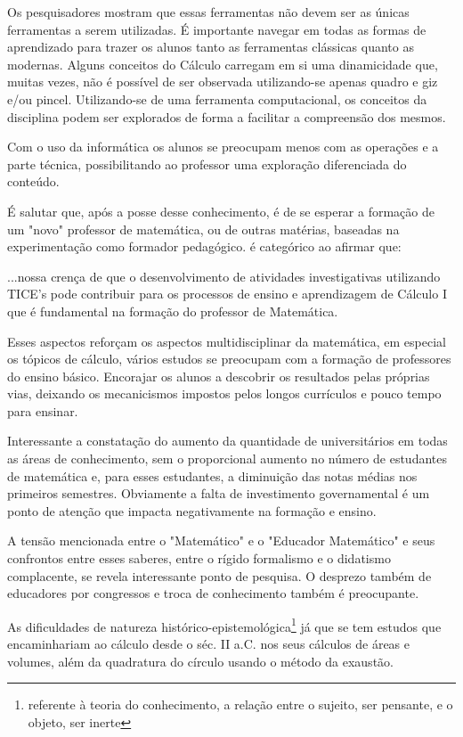 \documentclass[
	12pt,				%
	openright,			%
	oneside,
	a4paper,			%
	chapter=TITLE,		%
	section=TITLE,		%
	sumario=abnt-6027-2012,
	english,			%
	brazil				%
]{abntex2}
\begin{document}
	Os pesquisadores mostram que essas ferramentas não devem ser as únicas ferramentas a serem utilizadas. É importante navegar em todas as formas de aprendizado para trazer os alunos tanto as ferramentas clássicas quanto as modernas. Alguns conceitos do Cálculo carregam em si uma 	dinamicidade que, muitas vezes, não é possível de ser observada utilizando-se apenas quadro e giz e/ou pincel. Utilizando-se de uma ferramenta computacional, os conceitos da disciplina podem ser explorados de forma a facilitar a compreensão dos mesmos.
	
	Com o uso da informática os alunos se preocupam menos com as operações e a parte técnica, possibilitando ao professor uma exploração diferenciada do conteúdo. 
	
	É salutar que, após a posse desse conhecimento, é de se esperar a formação de um "novo" professor de matemática, ou de outras matérias, baseadas na experimentação como formador pedagógico.  é categórico ao afirmar que:
	
	
	\begin{citacao} 
		...nossa crença de que o desenvolvimento de atividades investigativas utilizando TICE’s pode contribuir para os processos de ensino e aprendizagem de Cálculo I que é fundamental na formação do professor de Matemática.
	\end{citacao}	
	
	Esses aspectos reforçam os aspectos multidisciplinar da matemática, em especial os tópicos de cálculo, vários estudos se preocupam com a formação de professores do ensino básico. Encorajar os alunos a descobrir os resultados pelas próprias vias, deixando os mecanicismos impostos pelos longos currículos e pouco tempo para ensinar.
	
	Interessante a constatação do aumento da quantidade de universitários em todas as áreas de conhecimento, sem o proporcional aumento no número de estudantes de matemática e, para esses estudantes, a diminuição das notas médias nos primeiros semestres. Obviamente a falta de investimento governamental é um ponto de atenção que impacta negativamente na formação e ensino.
	
	A tensão mencionada entre o "Matemático" e o "Educador Matemático" e seus confrontos entre esses saberes, entre o rígido formalismo e o didatismo complacente, se revela interessante ponto de pesquisa. O desprezo também de educadores por congressos e troca de conhecimento também é preocupante.
	
	As dificuldades de natureza histórico-epistemológica\footnote{referente à teoria do conhecimento, a relação entre o sujeito, ser pensante, e o objeto, ser inerte} já que se tem estudos que encaminhariam ao cálculo desde o séc. II a.C. nos seus cálculos de áreas e volumes, além da quadratura do círculo usando o método da exaustão.
	
\end{document}
